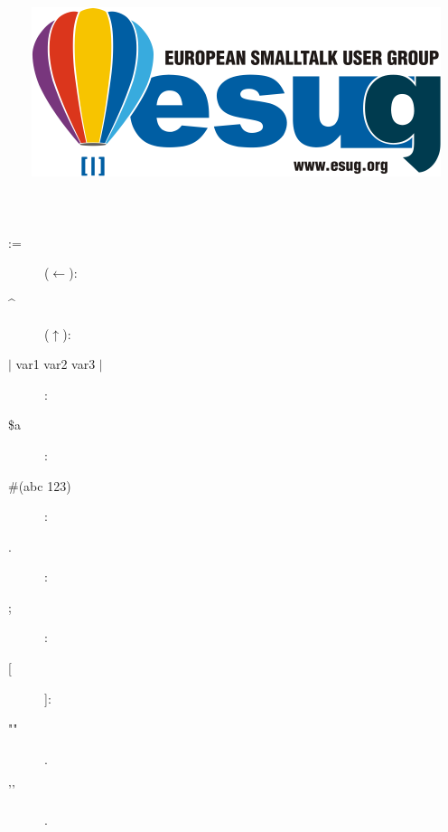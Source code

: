 \documentclass[notumble]{leaflet}
\title{
	\vfill
	\resizebox{\linewidth}{!}{\fontfamily{iwonac}\selectfont Smalltalk}%
	\\[\baselineskip]
	\normalfont
        \stSmalltalkSubtitle
        \\
	\vfill
	\includegraphics[width=\textwidth]{esug}
}
\date{}
\begin{document}
\stBeforeAnyText
\maketitle
\thispagestyle{empty}

\pagebreak{}

\section{\stSmalltalkConceptsTerm}

\stSmalltalkConceptsDefinition

\subsection{\stSmalltalkSyntaxTerm}
\paragraph{\stReservedWordsTerm}
\begin{description}
\end{description}

\paragraph{\stReservedCaractersTerm}

\begin{description}
\item[:=] (\stOrTerm $\leftarrow$):  \stAssignmentOperatorDefinition
\item[\^{}] (\stOrTerm $\uparrow$): \stReturnOperatorDefinition
\item[$\mid$ var1 var2 var3 $\mid$]: \stTempsDeclarationOperatorDefinition
\item[\$a]: \stDollarOperatorForCharacterADefinition
\item[\#(abc 123)]: \stLiteralArrayDefinition
\item[.]: \stDotOperatorDefinition
\item[;]: \stSemiColonOperatorDefinition
\item[[ ]]: \stBlockOperatorDefinition
\item["\stCommentTerm"].
\item['\stStringTerm'].
\end{description}

\pagebreak{}
\end{document}
